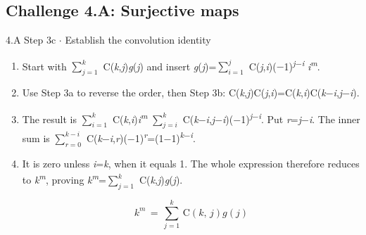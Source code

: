 \documentclass[11pt]{article}
\begin{document}
\begin{keepsection}\subsection{Challenge 4.A: Surjective maps}

\begin{workedbox}{4.A Step 3c \ensuremath{\cdot} Establish the convolution identity}
\begin{enumerate}
\item Start with $\sum_{{j}=1}^{{k}} $ C(\textit{k},\textit{j})\textit{g}(\textit{j}) and insert \textit{g}(\textit{j})=$\sum_{{i}=1}^{{j}} $ C(\textit{j},\textit{i})(\ensuremath{-}1)\textsuperscript{\textit{j}\ensuremath{-}\textit{i}} \textit{i}\textsuperscript{\textit{m}}.
\item Use Step 3a to reverse the order, then Step 3b: C(\textit{k},\textit{j})C(\textit{j},\textit{i})=C(\textit{k},\textit{i})C(\textit{k}\ensuremath{-}\textit{i},\textit{j}\ensuremath{-}\textit{i}).
\item The result is $\sum_{{i}=1}^{{k}} $ C(\textit{k},\textit{i})\textit{i}\textsuperscript{\textit{m}} $\sum_{{j}={i}}^{{k}} $ C(\textit{k}\ensuremath{-}\textit{i},\textit{j}\ensuremath{-}\textit{i})(\ensuremath{-}1)\textsuperscript{\textit{j}\ensuremath{-}\textit{i}}. Put \textit{r}=\textit{j}\ensuremath{-}\textit{i}. The inner sum is $\sum_{{r}=0}^{{k}-{i}} $ C(\textit{k}\ensuremath{-}\textit{i},\textit{r})(\ensuremath{-}1)\textsuperscript{\textit{r}}=(1\ensuremath{-}1)\textsuperscript{\textit{k}\ensuremath{-}\textit{i}}.
\item {}
It is zero unless \textit{i}=\textit{k}, when it equals 1. The whole expression therefore reduces to \textit{k}\textsuperscript{\textit{m}}, proving \textit{k}\textsuperscript{\textit{m}}=$\sum_{{j}=1}^{{k}} $ C(\textit{k},\textit{j})\textit{g}(\textit{j}).

\begin{equation*}{k}^{{m}}\, =\, \sum_{{j}=1}^{{k}} \, \mathrm{C}({k},\, {j}){g}({j})\end{equation*}
\end{enumerate}
\end{workedbox}

\end{keepsection}
\end{document}
